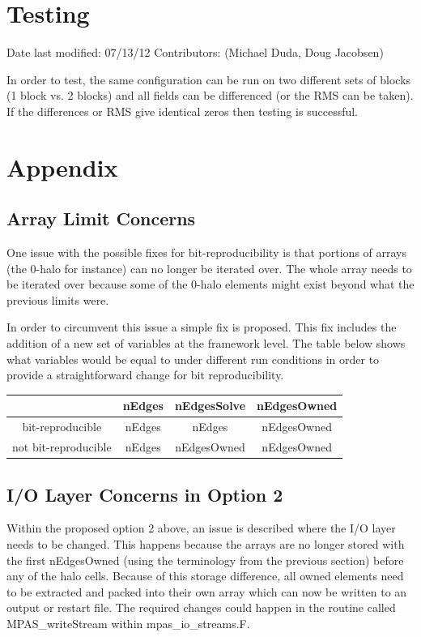 \documentclass[11pt]{report}
\begin{document}
\chapter{Testing}
Date last modified: 07/13/12 
Contributors: (Michael Duda, Doug Jacobsen)

In order to test, the same configuration can be run on two different sets of blocks (1 block vs. 2 blocks) and all fields can be differenced (or the RMS can be taken). If the differences or RMS give identical zeros then testing is successful.

\chapter{Appendix}
\section{Array Limit Concerns}
One issue with the possible fixes for bit-reproducibility is that portions of arrays (the 0-halo for instance) can no longer be iterated over. The whole array needs to be iterated over because some of the 0-halo elements might exist beyond what the previous limits were.

In order to circumvent this issue a simple fix is proposed. This fix includes the addition of a new set of variables at the framework level. The table below shows what variables would be equal to under different run conditions in order to provide a straightforward change for bit reproducibility.

\begin{tabular}{| c | c | c | c |}
	\hline
					 & nEdges & nEdgesSolve & nEdgesOwned \\
	\hline
    bit-reproducible & nEdges & nEdges & nEdgesOwned \\
	\hline
not bit-reproducible & nEdges & nEdgesOwned & nEdgesOwned \\
	\hline
\end{tabular}

\section{I/O Layer Concerns in Option 2}
Within the proposed option 2 above, an issue is described where the I/O layer needs to be changed. This happens because the arrays are no longer stored with the first nEdgesOwned (using the terminology from the previous section) before any of the halo cells. Because of this storage difference, all owned elements need to be extracted and packed into their own array which can now be written to an output or restart file. The required changes could happen in the routine called MPAS\_writeStream within mpas\_io\_streams.F.
\end{document}
